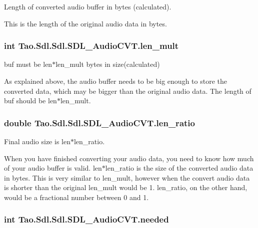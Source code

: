 Length of converted audio buffer in bytes (calculated). 

This is the length of the original audio data in bytes. \hypertarget{struct_tao_1_1_sdl_1_1_sdl_1_1_s_d_l___audio_c_v_t_ab4b192a9b37bc2b12a3c3e2ae75cff6b}{
\subsubsection[{len\_\-mult}]{\setlength{\rightskip}{0pt plus 5cm}int {\bf Tao.Sdl.Sdl.SDL\_\-AudioCVT.len\_\-mult}}}
\label{struct_tao_1_1_sdl_1_1_sdl_1_1_s_d_l___audio_c_v_t_ab4b192a9b37bc2b12a3c3e2ae75cff6b}


buf must be len$\ast$len\_\-mult bytes in size(calculated) 

As explained above, the audio buffer needs to be big enough to store the converted data, which may be bigger than the original audio data. The length of buf should be len$\ast$len\_\-mult. \hypertarget{struct_tao_1_1_sdl_1_1_sdl_1_1_s_d_l___audio_c_v_t_a44c58ef048924e18f4f7ad0fa43ee678}{
\subsubsection[{len\_\-ratio}]{\setlength{\rightskip}{0pt plus 5cm}double {\bf Tao.Sdl.Sdl.SDL\_\-AudioCVT.len\_\-ratio}}}
\label{struct_tao_1_1_sdl_1_1_sdl_1_1_s_d_l___audio_c_v_t_a44c58ef048924e18f4f7ad0fa43ee678}


Final audio size is len$\ast$len\_\-ratio. 

When you have finished converting your audio data, you need to know how much of your audio buffer is valid. len$\ast$len\_\-ratio is the size of the converted audio data in bytes. This is very similar to len\_\-mult, however when the convert audio data is shorter than the original len\_\-mult would be 1. len\_\-ratio, on the other hand, would be a fractional number between 0 and 1. \hypertarget{struct_tao_1_1_sdl_1_1_sdl_1_1_s_d_l___audio_c_v_t_af623472b2426f08b7cbaab7635012669}{
\subsubsection[{needed}]{\setlength{\rightskip}{0pt plus 5cm}int {\bf Tao.Sdl.Sdl.SDL\_\-AudioCVT.needed}}}
\label{struct_tao_1_1_sdl_1_1_sdl_1_1_s_d_l___audio_c_v_t_af623472b2426f08b7cbaab7635012669}


